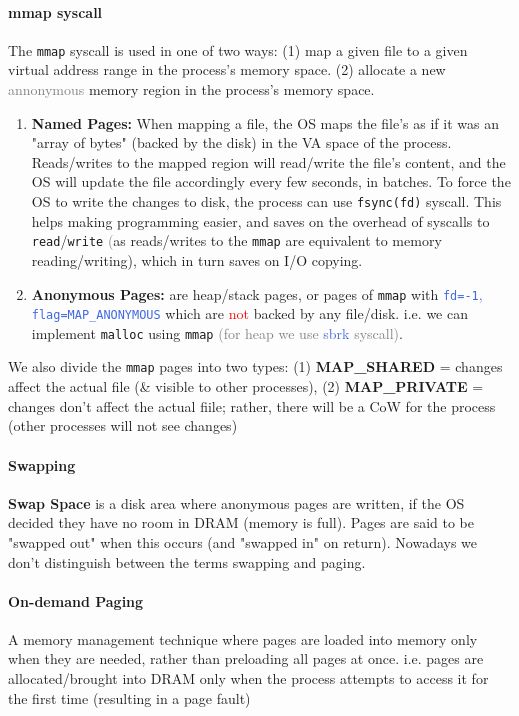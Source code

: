 \documentclass[openany,12pt]{book}
\newcommand{\code}[1]{\texttt{#1}}
\newcommand{\red}[1]{\textcolor{Red}{#1}}
\newcommand{\blue}[1]{\textcolor{RoyalBlue}{#1}}
\newcommand{\gray}[1]{\textcolor{gray}{#1}}
\begin{document}
\paragraph{mmap syscall} The \code{mmap} syscall is used in one of two ways: (1) map a given file to a given virtual address range in the process's memory space. (2) allocate a new \gray{annonymous} memory region in the process's memory space. 
\begin{enumerate}
  \item \textbf{Named Pages:} When mapping a file, the OS maps the file's as if it was an "array of bytes" (backed by the disk) in the VA space of the process. Reads/writes to the mapped region will read/write the file's content, and the OS will update the file accordingly every few seconds, in batches. To force the OS to write the changes to disk, the process can use \code{fsync(fd)} syscall. This helps making programming easier, and saves on the overhead of syscalls to \code{read}/\code{write} \gray(as reads/writes to the \code{mmap} are equivalent to memory reading/writing), which in turn saves on I/O copying.

  \item \textbf{Anonymous Pages:} are heap/stack pages, or pages of \code{mmap} with \blue{\code{fd=-1}, \code{flag=MAP\_ANONYMOUS}} which are \red{not} backed by any file/disk. i.e. we can implement \code{malloc} using \code{mmap} \gray{(for heap we use} \blue{sbrk} \gray{syscall)}.
\end{enumerate}
We also divide the \code{mmap} pages into two types: (1) \textbf{MAP\_SHARED} = changes affect the actual file (\& visible to other processes), (2) \textbf{MAP\_PRIVATE} = changes don't affect the actual fiile; rather, there will be a CoW for the process (other processes will not see changes)

\paragraph{Swapping} \textbf{Swap Space} is a disk area where anonymous pages are written, if the OS decided they have no room in DRAM (memory is full). Pages are said to be "swapped out" when this occurs (and "swapped in" on return). Nowadays we don't distinguish between the terms swapping and paging.


\paragraph{On-demand Paging} A memory management technique where pages are loaded into memory only when they are needed, rather than preloading all pages at once. i.e. pages are allocated/brought into DRAM only when the process attempts to access it for the first time (resulting in a page fault)
\end{document}

